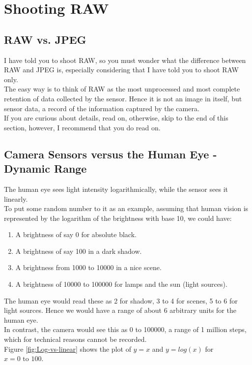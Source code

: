 \section{Shooting RAW}
\label{sec:shooting-RAW}

\subsection{RAW vs. JPEG}

I have told you to shoot \gls{RAW}, so you must wonder what the difference between \gls{RAW} and \gls{JPEG} is, especially considering that I have told you to shoot \gls{RAW} only.
\\
The easy way is to think of \gls{RAW} as the most unprocessed and most complete retention of data collected by the \gls{sensor}. Hence it is not an image in itself, but sensor data, a record of the information captured by the camera.
\\
If you are curious about details, read on, otherwise, skip to the end of this section, however, I recommend that you do read on.


\subsection{Camera Sensors versus the Human Eye - Dynamic Range}
\label{subsec:Camera-Sensor-Human-Eye}

The human eye sees light intensity logarithmically, while the \gls{sensor} sees it linearly.
\\
To put some random number to it as an example, assuming that human vision is represented by the logarithm of the brightness with base 10, we could have:

\begin{enumerate}
	\item A brightness of say 0 for absolute black.
	\item A brightness of say 100 in a dark shadow.
	\item A brightness from 1000 to 10000 in a nice scene.
	\item A brightness of 10000 to 100000 for lamps and the sun (light sources).
\end{enumerate}

The human eye would read these as 2 for shadow, 3 to 4 for scenes, 5 to 6 for light sources. Hence we would have a range of about 6 arbitrary units for the human eye.
\\
In contrast, the camera would see this as 0 to 100000, a range of 1 million steps, which for technical reasons cannot be recorded.
\\[\baselineskip]
Figure \ref{fig:Log-vs-linear} shows the plot of $y=x$ and $y=log(x)$ for $x=0 \mbox{ to }100$. 

